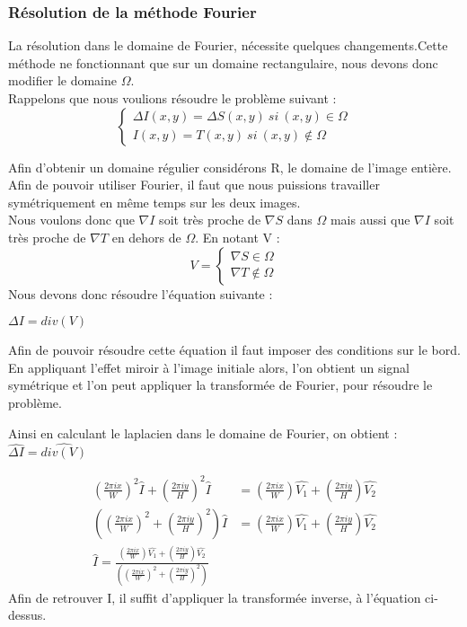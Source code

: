 \subsubsection{Résolution de la méthode Fourier}
La résolution dans le domaine de Fourier, nécessite quelques changements.Cette méthode ne fonctionnant que sur un domaine rectangulaire, nous devons donc modifier le domaine $\Omega$.\\
Rappelons que nous voulions résoudre le problème suivant :
\begin{equation}
\left\{
\begin{aligned}
\Delta I(x,y) = \Delta S(x,y) \ si \ (x,y) \in \Omega\\
I(x,y) = T(x,y) \ si \ (x,y) \notin \Omega
\end{aligned}
\right.
\end{equation}

Afin d'obtenir un domaine régulier considérons R, le domaine de l'image entière. Afin de pouvoir utiliser Fourier, il faut que nous puissions travailler symétriquement en même temps sur les deux images.\\
Nous voulons donc que $\nabla I$ soit très proche de $\nabla S$ dans $\Omega$ mais aussi que $\nabla I$ soit très proche de $\nabla T$ en dehors de $\Omega$. En notant V : 
\begin{equation}
V = 
\left\{
\begin{aligned}
\nabla S \in \Omega\\
\nabla T \notin \Omega
\end{aligned}
\right.
\end{equation}
Nous devons donc résoudre l'équation suivante : 
\begin{center}
$ \Delta I = div(V)$
\end{center}
Afin de pouvoir résoudre cette équation il faut imposer des conditions sur le bord. En appliquant l'effet miroir à l'image initiale alors, l'on obtient un signal symétrique  et l'on peut appliquer la transformée de Fourier, pour résoudre le problème. 

Ainsi en calculant le laplacien dans le domaine de Fourier, on obtient  : $\widehat{\Delta I} = \widehat{div(V)}$

\begin{equation}
\begin{aligned}
\left(\frac{2\pi i x}{W}\right)^2 \widehat{I}+\left(\frac{2\pi i y}{H}\right)^2 \widehat{I} & = \left(\frac{2\pi i x}{W}\right) \widehat{V_1}+\left(\frac{2\pi i y}{H}\right) \widehat{V_2}\\
\left(\left(\frac{2\pi i x}{W}\right)^2+\left(\frac{2\pi i y}{H}\right)^2\right) \widehat{I} & = \left(\frac{2\pi i x}{W}\right) \widehat{V_1}+\left(\frac{2\pi i y}{H}\right) \widehat{V_2}\\
\widehat{I} = \frac{\left(\frac{2\pi i x}{W}\right) \widehat{V_1}+\left(\frac{2\pi i y}{H}\right) \widehat{V_2}}{\left(\left(\frac{2\pi i x}{W}\right)^2+\left(\frac{2\pi i y}{H}\right)^2\right)}
\end{aligned}
\end{equation}
Afin de retrouver I, il suffit d'appliquer la transformée inverse, à l'équation ci-dessus.